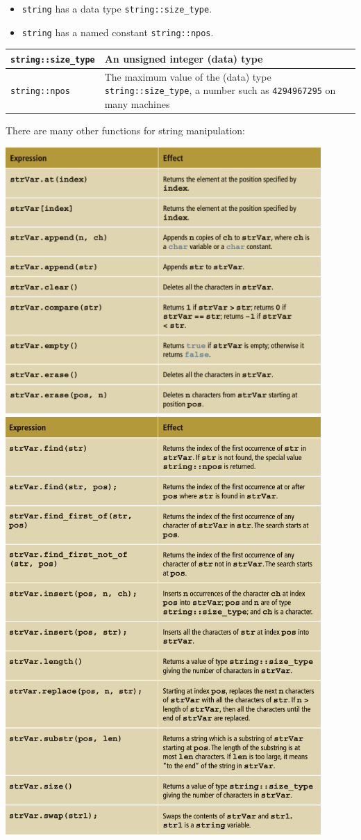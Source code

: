 \documentclass{article}
\begin{document}
\begin{itemize}
  \item \texttt{string} has a data type \texttt{string::size\_type}.
  \item \texttt{string} has a named constant \texttt{string::npos}.
\end{itemize}

\begin{tabular}{|l|p{8.3cm}|}
\hline
\texttt{string::size\_type} & An unsigned integer (data) type \\ \hline
\texttt{string::npos} & The maximum value of the (data) type \texttt{string::size\_type}, a number such as \texttt{4294967295} on many machines \\ \hline
\end{tabular}

\vspace{8pt}
There are many other functions for string manipulation:

\begin{center}
    \includegraphics[width=0.9\textwidth]{str-funcs-1.png}
    \includegraphics[width=0.9\textwidth]{str-funcs-2.png}
\end{center}
\end{document}
